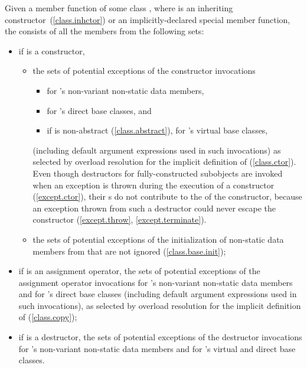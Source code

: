 \pnum
Given a member function  of some class , where  is
an inheriting constructor~(\ref{class.inhctor}) or an implicitly-declared special
member function,
the  
consists of all the members from the following sets:

\begin{itemize}
\item
if  is a constructor,
\begin{itemize}
\item
the sets of potential exceptions of the constructor invocations
\begin{itemize}
\item
for 's non-variant non-static data members,
\item
for 's direct base classes, and
\item
if  is non-abstract (\ref{class.abstract}), for 's virtual base
classes,
\end{itemize}
(including default argument expressions used in such invocations) as selected
by overload resolution for the implicit definition of  (\ref{class.ctor}).
\enternote
Even though destructors for fully-constructed subobjects are invoked
when an exception is thrown during the execution of a constructor (\ref{except.ctor}), their s do not contribute to the
 of the constructor, because
an exception thrown from such a destructor could never escape the constructor
(\ref{except.throw}, \ref{except.terminate}).
\exitnote
\item
the sets of potential exceptions of the initialization of non-static data members
from  that are not ignored (\ref{class.base.init});
\end{itemize}

\item
if  is an assignment operator, the sets of potential exceptions of
the assignment operator invocations for 's non-variant non-static
data members and for 's direct base classes (including default
argument expressions used in such invocations), as selected by overload resolution
for the implicit definition of  (\ref{class.copy});

\item
if  is a destructor, the sets of potential exceptions of the
destructor invocations for 's non-variant non-static data members
and for 's virtual and direct base classes.
\end{itemize}


